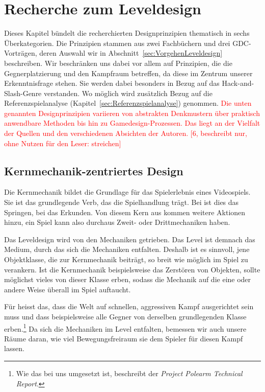 \documentclass[../Main.tex]{subfiles}
\begin{document}
\section{Recherche zum Leveldesign} \label{sec:Leveldesign}
Dieses Kapitel bündelt die recherchierten Designprinzipien thematisch in sechs Überkategorien. Die Prinzipien stammen aus zwei Fachbüchern und drei GDC-Vorträgen, deren Auswahl wir in Abschnitt~\ref{sec:VorgehenLeveldesign} beschreiben. Wir beschränken uns dabei vor allem auf Prinzipien, die die Gegnerplatzierung und den Kampfraum betreffen, da diese im Zentrum unserer Erkenntnisfrage stehen. Sie werden dabei besonders in Bezug auf das Hack-and-Slash-Genre verstanden. Wo möglich wird zusätzlich Bezug auf die Referenzspielanalyse (Kapitel~\ref{sec:Referenzspielanalyse}) genommen. \textcolor{red}{Die unten genannten Designprinzipien variieren von abstrakten Denkmustern über praktisch anwendbare Methoden bis hin zu Gamedesign-Prozessen. Das liegt an der Vielfalt der Quellen und den verschiedenen Absichten der Autoren. [6, beschreibt nur, ohne Nutzen für den Leser: streichen]}

\subsection{Kernmechanik-zentriertes Design} \label{sec:Kernmechanik}

Die Kernmechanik bildet die Grundlage für das Spielerlebnis eines Videospiels. Sie ist das grundlegende Verb, das die Spielhandlung trägt.\autocite[110]{totten2014architectural} Bei  ist dies das Springen, bei  das Erkunden.\autocites[110]{totten2014architectural}{nintendo_supermariobros_1985,nintendo_zelda_1986} Von diesem Kern aus kommen weitere Aktionen hinzu, ein Spiel kann also durchaus Zweit- oder Drittmechaniken haben.\autocite[110]{totten2014architectural}

Das Leveldesign wird von den Mechaniken getrieben. Das Level ist demnach das Medium, durch das sich die Mechaniken entfalten.\autocite{gdc_tenprinciples2010} Deshalb ist es sinnvoll, jene Objektklasse, die zur Kernmechanik beiträgt, so breit wie möglich im Spiel zu verankern. Ist die Kernmechanik beispielsweise das Zerstören von Objekten, sollte möglichst vieles von dieser Klasse erben, sodass die Mechanik auf die eine oder andere Weise überall im Spiel auftaucht.\autocite{gdc_movingmountains2020}

Für  heisst das, dass die Welt auf schnellen, aggressiven Kampf ausgerichtet sein muss und dass beispielsweise alle Gegner von derselben grundlegenden Klasse erben.\footnote{Wie das bei uns umgesetzt ist, beschreibt der \textit{Project Polearm Technical Report}.} Da sich die Mechaniken im Level entfalten, bemessen wir auch unsere Räume daran, wie viel Bewegungsfreiraum sie dem Spieler für diesen Kampf lassen.
\end{document}
